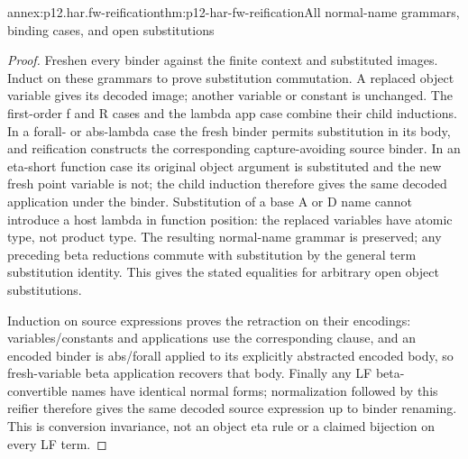 \begin{annexitem}{annex:p12.har.fw-reification}{thm:p12-har-fw-reification}{All normal-name grammars, binding cases, and open substitutions}
\begin{proof}
Freshen every binder against the finite context and substituted images.
Induct on these grammars to prove substitution commutation. A replaced
object variable gives its decoded image; another variable or constant
is unchanged. The first-order f and R cases and the lambda app case
combine their child inductions. In a forall- or abs-lambda case the
fresh binder permits substitution in its body, and reification constructs
the corresponding capture-avoiding source binder. In an eta-short
function case its original object argument is substituted and the new
fresh point variable is not; the child induction therefore gives the
same decoded application under the binder. Substitution of a base A
or D name cannot introduce a host lambda in function position: the
replaced variables have atomic type, not product type. The resulting
normal-name grammar is preserved; any preceding beta reductions commute
with substitution by the general term substitution identity. This gives
the stated equalities for arbitrary open object substitutions.

Induction on source expressions proves the retraction on their encodings:
variables/constants and applications use the corresponding clause, and
an encoded binder is abs/forall applied to its explicitly abstracted
encoded body, so fresh-variable beta application recovers that body.
Finally any LF beta-convertible names have identical normal forms;
normalization followed by this reifier therefore gives the same decoded
source expression up to binder renaming. This is conversion invariance,
not an object eta rule or a claimed bijection on every LF term.
\end{proof}
\end{annexitem}

